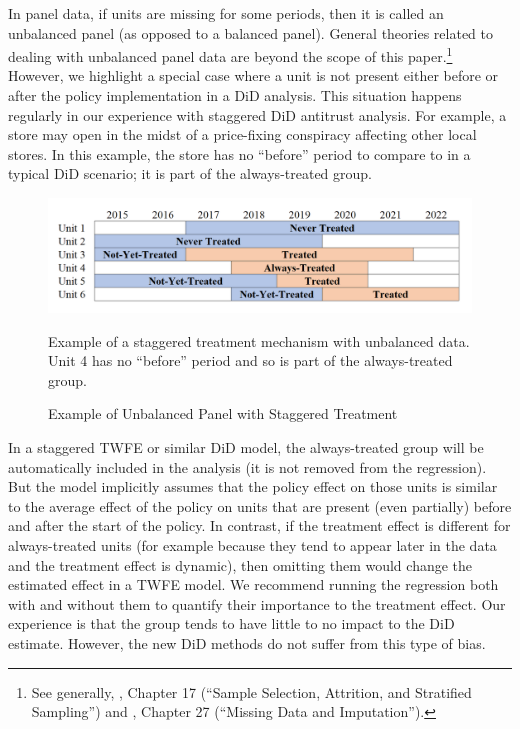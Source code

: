 \documentclass[12pt]{article}
\begin{document}
In panel data, if units are missing for some periods, then it is called an unbalanced panel (as opposed to a balanced panel). General theories related to dealing with unbalanced panel data are beyond the scope of this paper.\footnote{See generally, \citet{wooldridge2010a}, Chapter 17 (“Sample Selection, Attrition, and Stratified Sampling”) and \citet{cameron2020}, Chapter 27 (“Missing Data and Imputation”).}  However, we highlight a special case where a unit is not present either before or after the policy implementation in a DiD analysis. This situation happens regularly in our experience with staggered DiD antitrust analysis. For example, a store may open in the midst of a price-fixing conspiracy affecting other local stores. In this example, the store has no “before” period to compare to in a typical DiD scenario; it is part of the always-treated group.
\begin{figure}[H]
    \centering
    \caption{Example of Unbalanced Panel with Staggered Treatment}
    \includegraphics[width=6in]{Figures/Visual Staggered Unbalanced Treatment.PNG}
    \vspace{2mm}
    \footnotesize \begin{singlespace*}
        \parbox{5.5in}{Example of a staggered treatment mechanism with unbalanced data. Unit 4 has no “before” period and so is part of the always-treated group.}
    \end{singlespace*}
    \label{fig:visual-unbalanced}
\end{figure}
\noindent In a staggered TWFE or similar DiD model, the always-treated group will be automatically included in the analysis (it is not removed from the regression). But the model implicitly assumes that the policy effect on those units is similar to the average effect of the policy on units that are present (even partially) before and after the start of the policy. In contrast, if the treatment effect is different for always-treated units (for example because they tend to appear later in the data and the treatment effect is dynamic), then omitting them would change the estimated effect in a TWFE model. We recommend running the regression both with and without them to quantify their importance to the treatment effect. Our experience is that the group tends to have little to no impact to the DiD estimate. However, the new DiD methods do not suffer from this type of bias.
\end{document}
